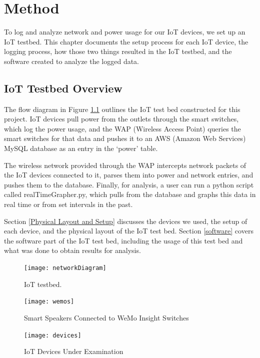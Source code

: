 \chapter{Method}
\label{Method}
To log and analyze network and power usage for our IoT devices, we set up an IoT testbed. This chapter documents the setup process for each IoT device, the logging process, how those two things resulted in the IoT testbed, and the software created to analyze the logged data.

\section{IoT Testbed Overview}
The flow diagram in Figure \ref{fig:network} outlines the IoT test bed constructed for this project. IoT devices pull power from the outlets through the smart switches, which log the power usage, and the WAP (Wireless Access Point) queries the smart switches for that data and pushes it to an AWS (Amazon Web Services)\cite{rds} MySQL\cite{mysql} database as an entry in the `power' table.

The wireless network provided through the WAP intercepts network packets of the IoT devices connected to it, parses them into power and network entries, and pushes them to the database. Finally, for analysis, a user can run a python script called realTimeGrapher.py, which pulls from the database and graphs this data in real time or from set intervals in the past.

Section \ref{Physical Layout and Setup} discusses the devices we used, the setup of each device, and the physical layout of the IoT test bed. Section \ref{software} covers the software part of the IoT test bed, including the usage of this test bed and what was done to obtain results for analysis.

\begin{figure}[H]
    \centering
    \texttt{[image: networkDiagram]}
    \caption{IoT testbed.}
    \label{fig:network}
\end{figure}

\begin{figure}[H]
    \centering
    \texttt{[image: wemos]}
    \caption{Smart Speakers Connected to WeMo Insight Switches}
    \label{fig:wemo}
\end{figure}

\begin{figure}[H]
    \centering
    \texttt{[image: devices]}
    \caption{IoT Devices Under Examination}
    \label{fig:devices}
\end{figure}

